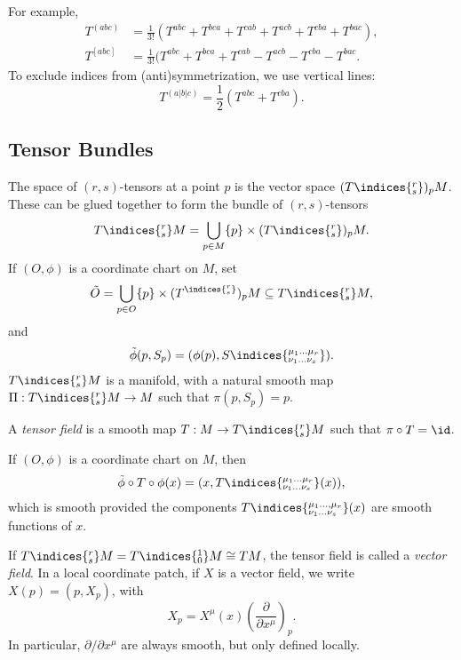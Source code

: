\documentclass[12pt]{article}
\begin{document}
For example,
\begin{align*}
	T^{(abc)} &= \frac{1}{3!} (T^{abc} + T^{bca} + T^{cab} + T^{acb} + T^{cba} + T^{bac}), \\
	T^{[abc]} &= \frac{1}{3!} (T^{abc} + T^{bca} + T^{cab} - T^{acb} - T^{cba} - T^{bac}.
\end{align*}
To exclude indices from (anti)symmetrization, we use vertical lines:
\[
T^{(a|b|c)} = \frac{1}{2} (T^{abc} + T^{c b a}).
\]
\subsection{Tensor Bundles}%
\label{sub:tense_buns}

The space of $(r, s)$-tensors at a point $p$ is the vector space $(T\indices{^{r}_{s}})_pM$. These can be glued together to form the bundle of $(r, s)$-tensors
\[
	T\indices{^{r}_{s}} M = \bigcup_{p \in M}\{ p\} \times (T\indices{^{r}_{s}} )_p M.
\]
If $(O, \phi)$ is a coordinate chart on $M$, set
\[
	\tilde O = \bigcup_{p \in O} \{p\} \times (T^{\indices{^{r}_{s}}})_p M \subseteq T\indices{^{r}_{s}}M,
\]
and
\[
\tilde \phi(p, S_p) = (\phi(p), S\indices{^{\mu_1 \ldots \mu_r}_{\nu_1 \ldots \nu_s}} ).
\]
$T\indices{^{r}_{s}} M$ is a manifold, with a natural smooth map $\Pi : T\indices{^{r}_{s}}M \to M$ such that $\pi(p, S_p) = p$.

A \emph{tensor field} is a smooth map $T : M \to T\indices{^{r}_{s}}M$ such that $\pi \circ T = \id$.

If $(O, \phi)$ is a coordinate chart on $M$, then
\[
\tilde \phi \circ T \circ \phi(x) = (x, T\indices{^{\mu_1 \ldots \mu_r}_{ \nu_1 \ldots \nu_s}}(x)),
\]
which is smooth provided the components $T\indices{^{\mu_1 \ldots, \mu_r}_{ \nu_1 \ldots \nu_s}}(x)$ are smooth functions of $x$.

\begin{exbox}
	If $T\indices{^{r}_{s}} M = T\indices{^{1}_{0}}M \cong TM$, the tensor field is called a \emph{vector field}. In a local coordinate patch, if $X$ is a vector field, we write $X(p) = (p, X_p)$, with
	\[
	X_p = X^\mu(x) \left( \frac{\partial}{\partial x^\mu} \right)_p.
	\]
	In particular, $\partial / \partial x^\mu$ are always smooth, but only defined locally.
\end{exbox}


\newpage

\printindex
\end{document}
